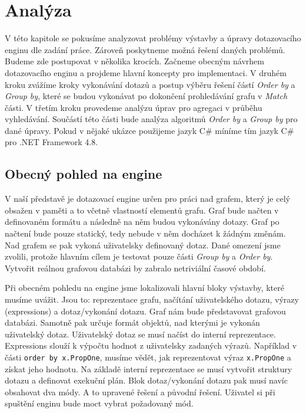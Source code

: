 \chapter{Analýza}

V této kapitole se pokusíme analyzovat problémy výstavby a úpravy dotazovacího enginu dle zadání práce.
Zároveň poskytneme možná řešení daných problémů.
Budeme zde postupovat v několika krocích. 
Začneme obecným návrhem dotazovacího enginu a projdeme hlavní koncepty pro implementaci.
V druhém kroku zvážíme kroky vykonávání dotazů a postup výběru řešení částí \textit{Order by} a \textit{Group by}, které se budou vykonávat po dokončení prohledávání grafu v \textit{Match} části.
V třetím kroku provedeme analýzu úprav pro agregaci v průběhu vyhledávání. 
Součástí této části bude analýza algoritmů \textit{Order by} a \textit{Group by} pro dané úpravy. 
Pokud v nějaké ukázce použijeme jazyk C\# míníme tím jazyk C\# pro .NET Framework 4.8.

\section{Obecný pohled na engine}

V naší představě je dotazovací engine určen pro práci nad grafem, který je celý obsažen v paměti a to včetně vlastností elementů grafu.
Graf bude načten v definovaném formátu a následně na něm budou vykonávány dotazy.
Graf po načtení bude pouze statický, tedy nebude v něm docházet k žádným změnám.
Nad grafem se pak vykoná uživatelsky definovaný dotaz.
Dané omezení jsme zvolili, protože hlavním cílem je testovat pouze části \textit{Group by} a \textit{Order by}.
Vytvořit reálnou grafovou databázi by zabralo netriviální časové období.

Při obecném pohledu na engine jsme lokalizovali hlavní bloky výstavby, které musíme uvážit.
Jsou to: reprezentace grafu, načítání uživatelského dotazu, výrazy (expressions) a dotaz/vykonání dotazu.
Graf nám bude představovat grafovou databázi. 
Samotně pak určuje formát objektů, nad kterými je vykonán uživatelský dotaz.
Uživatelský dotaz se musí načíst do interní reprezentace.
Expressions slouží k výpočtu hodnot z uživatelsky zadaných výrazů.
Například v části \texttt{order by x.PropOne}, musíme vědět, jak reprezentovat výraz \texttt{x.PropOne} a získat jeho hodnotu. 
Na základě interní reprezentace se musí vytvořit struktury dotazu a definovat exekuční plán. 
Blok dotaz/vykonání dotazu pak musí navíc obsahovat dva módy.
A to upravené řešení a původní řešení.
Uživatel si při spuštění enginu bude moct vybrat požadovaný mód.

